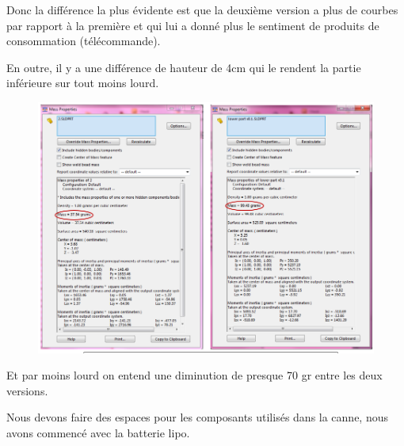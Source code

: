 \FloatBarrier

Donc la différence la plus évidente est que la deuxième version a plus de courbes par rapport à la première et qui lui a donné plus le sentiment de produits de consommation (télécommande).

En outre, il y a une différence de hauteur de 4cm qui le rendent la partie inférieure sur tout moins lourd.

\begin{figure}[!htbp]
    \centering
    \includegraphics[width=\linewidth]{assets/conception1/10.png}
\end{figure}

\FloatBarrier

Et par moins lourd on entend une diminution de presque 70 gr entre les deux versions.

Nous devons faire des espaces pour les composants utilisés dans la canne, nous avons commencé avec la batterie lipo.

